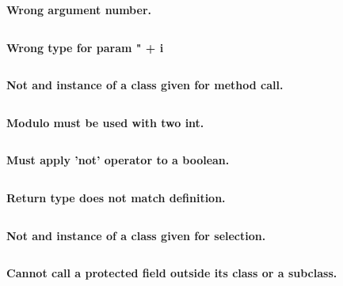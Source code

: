 \documentclass[a4,12pt]{article}
\begin{document}
\textbf{Wrong argument number.}\\

\begin{lstlisting}

\end{lstlisting}




\textbf{Wrong type for param " + i}\\

\begin{lstlisting}

\end{lstlisting}




\textbf{Not and instance of a class given for method call.}\\

\begin{lstlisting}

\end{lstlisting}




\textbf{Modulo must be used with two int.}\\

\begin{lstlisting}

\end{lstlisting}




\textbf{Must apply 'not' operator to a boolean.}\\

\begin{lstlisting}

\end{lstlisting}




\textbf{Return type does not match definition.}\\

\begin{lstlisting}

\end{lstlisting}




\textbf{Not and instance of a class given for selection.}\\

\begin{lstlisting}

\end{lstlisting}




\textbf{Cannot call a protected field outside its class or a subclass.}\\
\end{document}
